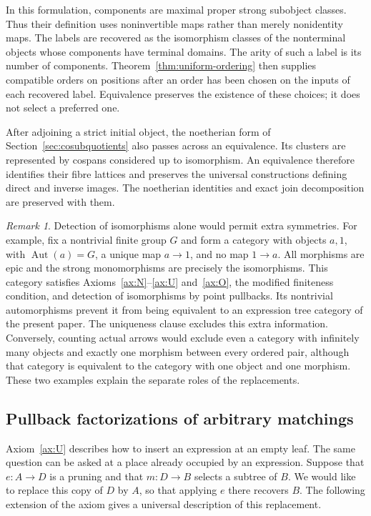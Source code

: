 \documentclass[11pt,a4paper]{article}
\theoremstyle{plain}
\theoremstyle{definition}
\theoremstyle{remark}
\newtheorem{remark}[theorem]{Remark}
\begin{document}
In this formulation, components are maximal proper strong
subobject classes. Thus their definition uses noninvertible
maps rather than merely nonidentity maps. The labels are
recovered as the isomorphism classes of the nonterminal
objects whose components have terminal domains.
The arity of such a label is its number of components.
Theorem~\ref{thm:uniform-ordering} then supplies compatible
orders on positions after an order has been chosen on the
inputs of each recovered label. Equivalence preserves the
existence of these choices; it does not select a preferred
one.

After adjoining a strict initial object, the noetherian form
of Section~\ref{sec:cosubquotients} also passes across an
equivalence. Its clusters are represented by cospans considered
up to isomorphism. An equivalence therefore identifies their
fibre lattices and preserves the universal constructions
defining direct and inverse images. The noetherian identities
and exact join decomposition are preserved with them.

\begin{remark}\label{concl:rigidity-remark}
Detection of isomorphisms alone would permit extra symmetries.
For example, fix a nontrivial finite group $G$ and form a
category with objects $a,1$, with $\operatorname{Aut}(a)=G$,
a unique map $a\to1$, and no map $1\to a$. All morphisms
are epic and the strong monomorphisms are precisely the
isomorphisms. This category satisfies
Axioms~\ref{ax:N}--\ref{ax:U} and~\ref{ax:O}, the modified
finiteness condition, and detection of isomorphisms by point
pullbacks. Its nontrivial automorphisms prevent it from being
equivalent to an expression tree category of the present
paper. The uniqueness clause excludes this extra information.
Conversely, counting actual arrows would exclude even a
category with infinitely many objects and exactly one
morphism between every ordered pair, although that category
is equivalent to the category with one object and one
morphism. These two examples explain the separate roles of
the replacements.
\end{remark}

\subsection{Pullback factorizations of arbitrary matchings}
\label{concl:pullback-complements}

Axiom~\ref{ax:U} describes how to insert an expression at an empty
leaf. The same question can be asked at a place already occupied
by an expression. Suppose that $e:A\to D$ is a pruning and that
$m:D\to B$ selects a subtree of $B$. We would like to replace this
copy of $D$ by $A$, so that applying $e$ there recovers $B$. The
following extension of the axiom gives a universal description of
this replacement.
\end{document}
